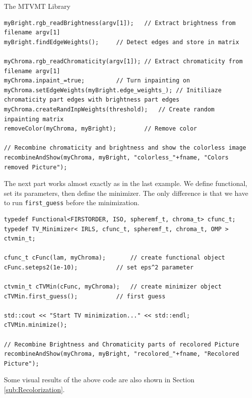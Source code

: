 \begin{chapter}{The MTVMT Library}
\cppinline
\begin{lstlisting}[label=code:tut2_edgeandcolorremoval,caption={Color and brightness input, edge detection and color removal}]
myBright.rgb_readBrightness(argv[1]);	// Extract brightness from filename argv[1]
myBright.findEdgeWeights();		// Detect edges and store in matrix

myChroma.rgb_readChromaticity(argv[1]); // Extract chromaticity from filename argv[1]
myChroma.inpaint_=true;			// Turn inpainting on
myChroma.setEdgeWeights(myBright.edge_weights_); // Initiliaze chromaticity part edges with brightness part edges
myChroma.createRandInpWeights(threshold);   // Create random inpainting matrix
removeColor(myChroma, myBright);	    // Remove color

// Recombine chromaticity and brightness and show the colorless image
recombineAndShow(myChroma, myBright, "colorless_"+fname, "Colors removed Picture");
\end{lstlisting}

The next part works almost exactly as in the last example. We define functional, set its parameters, then define the minimizer. The only difference is that
we have to run \texttt{first\_guess} before the minimization.\\

\cppinline
\begin{lstlisting}[label=code:tut2_functionalmin,caption={Functional and minimizer definition, first guess and minimization}]
typedef Functional<FIRSTORDER, ISO, spheremf_t, chroma_t> cfunc_t;
typedef TV_Minimizer< IRLS, cfunc_t, spheremf_t, chroma_t, OMP > ctvmin_t;

cfunc_t cFunc(lam, myChroma);	    // create functional object
cFunc.seteps2(1e-10);		    // set eps^2 parameter

ctvmin_t cTVMin(cFunc, myChroma);   // create minimizer object
cTVMin.first_guess();		    // first guess

std::cout << "Start TV minimization..." << std::endl;
cTVMin.minimize();		    

// Recombine Brightness and Chromaticity parts of recolored Picture
recombineAndShow(myChroma, myBright, "recolored_"+fname, "Recolored Picture");
\end{lstlisting}

Some visual results of the above code are also shown in Section \ref{sub:Recolorization}.





\end{chapter}
